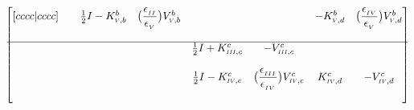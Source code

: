 \documentclass{article}
\newcommand{\RomCap}[1]
    {\MakeUppercase{\scaleto{\romannumeral #1}{3.5pt}}}
\newcommand{\myfrac}[3][0pt]{\genfrac{}{}{}{}{\raisebox{#1}{$#2$}}{\raisebox{-#1}{$#3$}}}
\begin{document}
\begin{equation}
\begin{bmatrix}[cccc|cccc]
			 &  & 	
			
			\iffalse
	     	A_{43} &
			\fi

			\frac{1}{2}I-K^{b}_{\RomCap{5},b} & 

			\iffalse
	     	A_{44} &
			\fi

			\big(\myfrac[3pt]{\epsilon_{_\RomCap{2}}}{\epsilon_{_\RomCap{5}}}\big)V^{b}_{\RomCap{5},b} &

	     	\iffalse
	     	A_{45} & A_{46} & 
	     	\fi
			
	     	 &	 &

	     	\iffalse
	     	A_{47} & 
	     	\fi
			
	     	-K^{b}_{\RomCap{5},d} &

			\iffalse
	     	A_{48} \\
			\fi

			\big(\myfrac[3pt]{\epsilon_{_\RomCap{4}}}{\epsilon_{_\RomCap{5}}}\big)V^{b}_{\RomCap{5},d} \\ 
             &  &  &  &  &  &  & \\
            \hline
	     	\iffalse
	     	Row 5 : A_{51} & A_{52} & A_{53} & A_{54} &
			\fi
			
	     	 &  &  &  & 

	     	\iffalse
	     	A_{55} & A_{56} &
			\fi
			
	     	\frac{1}{2}I+K^{c}_{\RomCap{3},c} & -V^{c}_{\RomCap{3},c} &  

	     	\iffalse
	     	A_{57} & A_{58} \\
			\fi

			 &  \\ 
             &  &  &  &  &  &  & \\
	     	\iffalse
	     	Row 6 : A_{61} & A_{62} & A_{63} & A_{64} &
			\fi
			
	     	 &  &  &  & 

	     	\iffalse
	     	A_{65} &
			\fi
			
			\frac{1}{2}I-K^{c}_{\RomCap{4},c} & 	
			
			\iffalse
	     	A_{66} &
			\fi
	     	
	     	\big(\myfrac[3pt]{\epsilon_{_\RomCap{3}}}{\epsilon_{_\RomCap{4}}}\big)V^{c}_{\RomCap{4},c} &
	     	
	     	\iffalse
	     	A_{67} & A_{68} \\
			\fi

			K^{c}_{\RomCap{4},d} & -V^{c}_{\RomCap{4},d} \\ 
            &  &  &  &  &  &  & \\
	     	\iffalse
	     	Row 7 : A_{71} & A_{72} & A_{73} & A_{74} &
			\fi
			

\end{bmatrix}
\end{equation}
\end{document}
